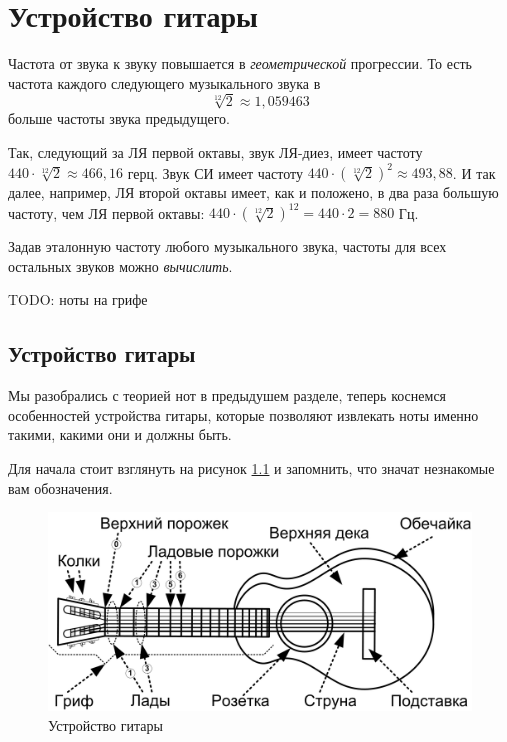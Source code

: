 \chapter{Устройство гитары}
\label{ch:guitar}

Частота от звука к звуку повышается в \emph{геометрической} прогрессии. То есть частота каждого следующего музыкального звука в \[\sqrt[12]{2}\approx 1,059463\] больше частоты звука предыдущего.

Так, следующий за ЛЯ первой октавы, звук ЛЯ-диез, имеет частоту $440\cdot\sqrt[12]{2}\approx 466,16$ герц. Звук СИ имеет частоту $440\cdot(\sqrt[12]{2})^2\approx 493,88$. И так далее, например, ЛЯ второй октавы имеет, как и положено, в два раза большую частоту, чем ЛЯ первой октавы: $440\cdot(\sqrt[12]{2})^{12}=440\cdot 2=880$ Гц.

Задав эталонную частоту любого музыкального звука, частоты для всех остальных звуков можно \emph{вычислить}.


TODO: ноты на грифе

\section{Устройство гитары}

Мы разобрались с теорией нот в предыдушем разделе, теперь коснемся особенностей устройства гитары, которые позволяют извлекать ноты именно такими, какими они и должны быть. 

Для начала стоит взглянуть на рисунок \ref{fig:guitarConstruction} и запомнить, что значат незнакомые вам обозначения.

\begin{figure}[!ht]
    \centering
    \includegraphics{fig/guitar-construction} 
    \caption{Устройство гитары}\label{fig:guitarConstruction}
\end{figure} 

